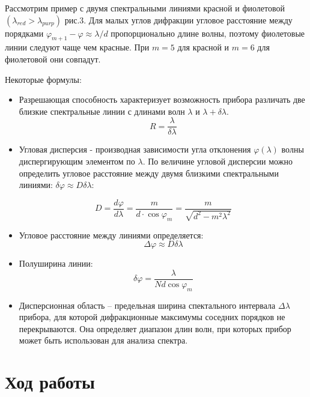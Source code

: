\documentclass[a4paper,12pt]{article}
\theoremstyle{plain} %
\theoremstyle{definition} %
\theoremstyle{remark} %
\begin{document}
Рассмотрим пример с двумя спектральными линиями красной и фиолетовой $(\lambda_{red}> \lambda_{purp})$ рис.3. Для малых углов дифракции угловое расстояние между порядками $\varphi_{m+1} - \varphi \approx \lambda /d$ пропорционально длине волны, поэтому фиолетовые линии следуют чаще чем красные. При $m = 5$ для красной и $m = 6$ для фиолетовой они совпадут. \par 

Некоторые формулы:

\begin{itemize}
	\item Разрешающая способность характеризует возможность прибора различать две близкие спектральные линии с длинами волн $\lambda$ и $\lambda + \delta \lambda$.
	\begin{equation}
	R = \frac{\lambda}{\delta \lambda}
	\end{equation}
	
	\item Угловая дисперсия - производная зависимости угла отклонения $\varphi(\lambda)$ волны диспергирующим элементом по $\lambda$. По величине угловой дисперсии можно определить угловое расстояние между двумя близкими спектральными линиями: $\delta \varphi \approx D \delta \lambda$:
	
	\begin{equation}
	D = \frac{d \varphi}{d \lambda} = \frac{m}{d \cdot \cos{\varphi_m}} = \frac{m}{\sqrt{d^2 - m^2 \lambda^2}}
	\end{equation}
	
	\item Угловое расстояние между линиями определяется:
	\begin{equation}
	\Delta \varphi \approx D \delta \lambda
	\end{equation}
	
	\item Полуширина линии:
	\begin{equation}
	\delta \varphi = \frac{\lambda}{Nd \cos{\varphi_m}}
	\end{equation}
	
	\item Дисперсионная область – предельная ширина спектального интервала $\Delta \lambda$ прибора, для которой дифракционные максимумы соседних порядков не перекрываются. Она определяет диапазон длин волн, при которых прибор может быть использован для анализа спектра.
	
\end{itemize}


\section{Ход работы}
\end{document}
